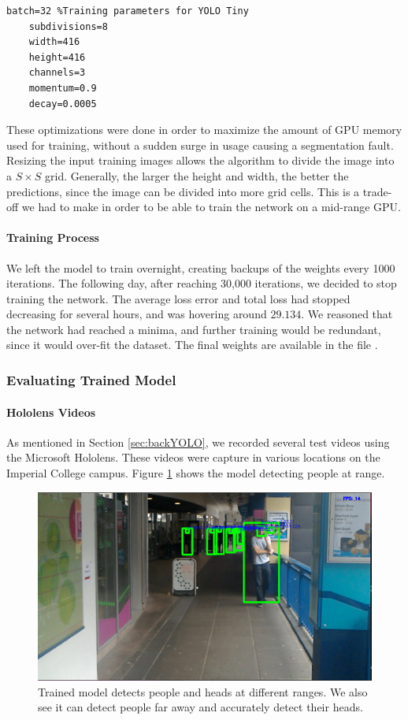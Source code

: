 \begin{lstlisting}[language=Mymatlab,caption={Training parameters used for YOLOv3 Tiny on the CrowdHuman dataset}]
	batch=32 %Training parameters for YOLO Tiny
	subdivisions=8
	width=416
	height=416
	channels=3
	momentum=0.9
	decay=0.0005
\end{lstlisting}

These optimizations were done in order to maximize the amount of GPU memory used for training, without a sudden surge in usage causing a segmentation fault. Resizing the input training images allows the algorithm to divide the image into a $S\times S$ grid. Generally, the larger the height and width, the better the predictions, since the image can be divided into more grid cells. This is a trade-off we had to make in order to be able to train the network on a mid-range GPU.

\paragraph{Training Process} We left the model to train overnight, creating backups of the weights every 1000 iterations. The following day, after reaching 30,000 iterations, we decided to stop training the network. The average loss error and total loss had stopped decreasing for several hours, and was hovering around $29.134$. We reasoned that the network had reached a minima, and further training would be redundant, since it would over-fit the dataset. The final weights are available in the file  .

\subsubsection{Evaluating Trained Model}
\paragraph{Hololens Videos} As mentioned in Section \ref{sec:backYOLO}, we recorded several test videos using the Microsoft Hololens. These videos were capture in various locations on the Imperial College campus. Figure \ref{fig:yoloRange} shows the model detecting people at range.  

\begin{figure}[ht]
	\centering
	\includegraphics[width=0.5\linewidth]{img/chapter5_implementation/yoloWalkway.png}
	\caption{Trained model detects people and heads at different ranges. We also see it can detect people far away and accurately detect their heads.}
	\label{fig:yoloRange}
\end{figure}

